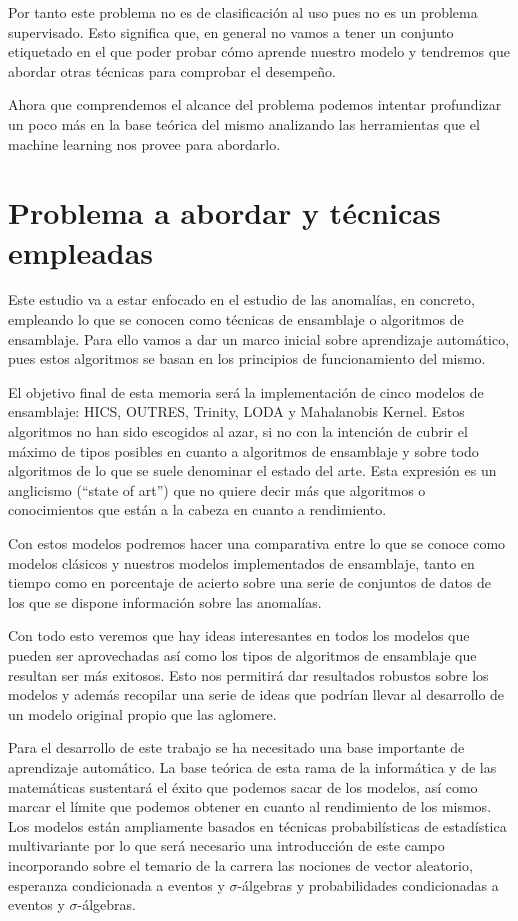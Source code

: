 Por tanto este problema no es de clasificación al uso pues no es un problema supervisado. Esto significa que, en general no vamos a tener un conjunto etiquetado en el que poder probar cómo aprende nuestro modelo y tendremos que abordar otras técnicas para comprobar el desempeño.

Ahora que comprendemos el alcance del problema podemos intentar profundizar un poco más en la base teórica del mismo analizando las herramientas que el machine learning nos provee para abordarlo.

\section{Problema a abordar y técnicas empleadas}

Este estudio va a estar enfocado en el estudio de las anomalías, en concreto, empleando lo que se conocen como técnicas de ensamblaje o algoritmos de ensamblaje. Para ello vamos a dar un marco inicial sobre aprendizaje automático, pues estos algoritmos se basan en los principios de funcionamiento del mismo. 

El objetivo final de esta memoria será la implementación de cinco modelos de ensamblaje: HICS, OUTRES, Trinity, LODA y Mahalanobis Kernel. Estos algoritmos no han sido escogidos al azar, si no con la intención de cubrir el máximo de tipos posibles en cuanto a algoritmos de ensamblaje y sobre todo algoritmos de lo que se suele denominar el estado del arte. Esta expresión es un anglicismo (``state of art'') que no quiere decir más que algoritmos o conocimientos que están a la cabeza en cuanto a rendimiento.

Con estos modelos podremos hacer una comparativa entre lo que se conoce como modelos clásicos y nuestros modelos implementados de ensamblaje, tanto en tiempo como en porcentaje de acierto sobre una serie de conjuntos de datos de los que se dispone información sobre las anomalías.

Con todo esto veremos que hay ideas interesantes en todos los modelos que pueden ser aprovechadas así como los tipos de algoritmos de ensamblaje que resultan ser más exitosos. Esto nos permitirá dar resultados robustos sobre los modelos y además recopilar una serie de ideas que podrían llevar al desarrollo de un modelo original propio que las aglomere.

Para el desarrollo de este trabajo se ha necesitado una base importante de aprendizaje automático. La base teórica de esta rama de la informática y de las matemáticas sustentará el éxito que podemos sacar de los modelos, así como marcar el límite que podemos obtener en cuanto al rendimiento de los mismos. Los modelos están ampliamente basados en técnicas probabilísticas de estadística multivariante por lo que será necesario una introducción de este campo incorporando sobre el temario de la carrera las nociones de vector aleatorio, esperanza condicionada a eventos y $\sigma$-álgebras y probabilidades condicionadas a eventos y $\sigma$-álgebras.

